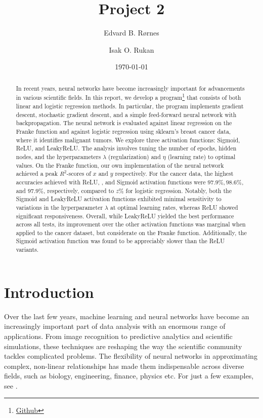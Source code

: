 \documentclass[%
reprint,s
amsmath,amssymb,
aps,
]{revtex4-2}
\begin{document}
	
\title{Project 2}
\author{Edvard B. Rørnes}
\author{Isak O. Rukan}
\date{\today}

\begin{abstract}
	In recent years, neural networks have become increasingly important for advancements in various scientific fields. In this report, we develop a program\footnote{\href{https://github.com/EdvardRornes/FYS-STK4155/tree/main/Project1}{Github}} that consists of both linear and logistic regression methods. In particular, the program implements gradient descent, stochastic gradient descent, and a simple feed-forward neural network with backpropagation. The neural network is evaluated against linear regression on the Franke function and against logistic regression using sklearn's breast cancer data, where it identifies malignant tumors. We explore three activation functions: Sigmoid, ReLU, and LeakyReLU. The analysis involves tuning the number of epochs, hidden nodes, and the hyperparameters $\lambda$ (regularization) and $\eta$ (learning rate) to optimal values. On the Franke function, our own implementation of the neural network achieved a peak $R^2$-scores of $x$ and $y$ respectively. For the cancer data, the highest accuracies achieved with ReLU, , and Sigmoid activation functions were $97.9\%, 98.6\%$, and $97.9\%$, respectively, compared to $z\%$ for logistic regression. Notably, both the Sigmoid and LeakyReLU activation functions exhibited minimal sensitivity to variations in the hyperparameter $\lambda$ at optimal learning rates, whereas ReLU showed significant responsiveness. Overall, while LeakyReLU yielded the best performance across all tests, its improvement over the other activation functions was marginal when applied to the cancer dataset, but considerate on the Franke function. Additionally, the Sigmoid activation function was found to be appreciably slower than the ReLU variants.
\end{abstract}

\maketitle

\section{Introduction}
Over the last few years, machine learning and neural networks have become an increasingly important part of data analysis with an enormous range of applications. From image recognition to predictive analytics and scientific simulations, these techniques are reshaping the way the scientific community tackles complicated problems. The flexibility of neural networks in approximating complex, non-linear relationships has made them indispensable across diverse fields, such as biology, engineering, finance, physics etc. For just a few examples, see \cite{dawid2023modernapplicationsmachinelearning,thapar2023applicationsmachinelearningmodelling,mohammadi2022applicationsmachinelearninghealthcare}.
\end{document}
